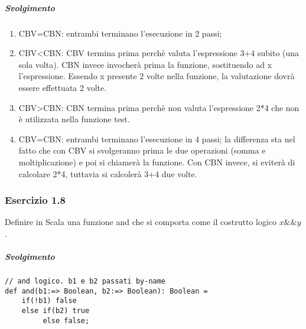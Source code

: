 \subparagraph{Svolgimento}
\begin{enumerate}
	\item CBV=CBN: entrambi terminano l'esecuzione in 2 passi; 
	\item CBV<CBN: CBV termina prima perchè valuta l'espressione 3+4 subito (una sola volta). CBN invece invocherà prima la funzione, sostituendo ad x l'espressione. Essendo x presente 2 volte nella funzione, la valutazione dovrà essere effettuata 2 volte. 
	\item CBV>CBN: CBN termina prima perchè non valuta l'espressione 2*4 che non è utilizzata nella funzione test.
	\item CBV=CBN: entrambi terminano l'esecuzione in 4 passi; la differenza sta nel fatto che con CBV si svolgeranno prima le due operazioni (somma e moltiplicazione) e poi si chiamerà la funzione. Con CBN invece, si eviterà di calcolare 2*4, tuttavia si calcolerà 3+4 due volte.
\end{enumerate}



\subsubsection*{Esercizio 1.8}
Definire in Scala una funzione and che si comporta come il costrutto logico $x\&\&y$. 

\subparagraph{Svolgimento}

\begin{lstlisting}
// and logico. b1 e b2 passati by-name 
def and(b1:=> Boolean, b2:=> Boolean): Boolean =
	if(!b1) false
	else if(b2) true
		 else false; 
\end{lstlisting}












